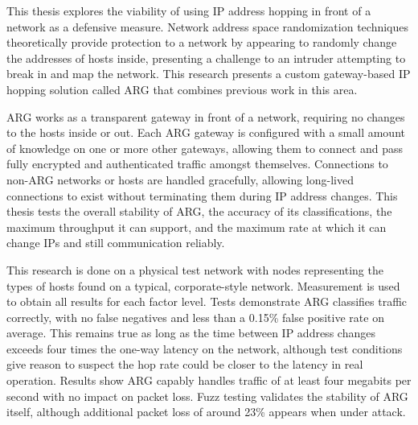 \par This thesis explores the viability of using \ac{IP} address hopping in front of a network as a defensive measure. Network address space randomization techniques theoretically provide protection to a network by appearing to randomly change the addresses of hosts inside, presenting a challenge to an intruder attempting to break in and map the network. This research presents a custom gateway-based \ac{IP} hopping solution called \ac{ARG} that combines previous work in this area.

\par \ac{ARG} works as a transparent gateway in front of a network, requiring no changes to the hosts inside or out. Each \ac{ARG} gateway is configured with a small amount of knowledge on one or more other gateways, allowing them to connect and pass fully encrypted and authenticated traffic amongst themselves. Connections to non-\ac{ARG} networks or hosts are handled gracefully, allowing long-lived connections to exist without terminating them during \ac{IP} address changes. This thesis tests the overall stability of \ac{ARG}, the accuracy of its classifications, the maximum throughput it can support, and the maximum rate at which it can change \acp{IP} and still communication reliably.

\par This research is done on a physical test network with nodes representing the types of hosts found on a typical, corporate-style network. Measurement is used to obtain all results for each factor level. Tests demonstrate \ac{ARG} classifies traffic correctly, with no false negatives and less than a 0.15\% false positive rate on average. This remains true as long as the time between \ac{IP} address changes exceeds four times the one-way latency on the network, although test conditions give reason to suspect the hop rate could be closer to the latency in real operation. Results show \ac{ARG} capably handles traffic of at least four megabits per second with no impact on packet loss. Fuzz testing validates the stability of \ac{ARG} itself, although additional packet loss of around 23\% appears when under attack.

\acresetall

